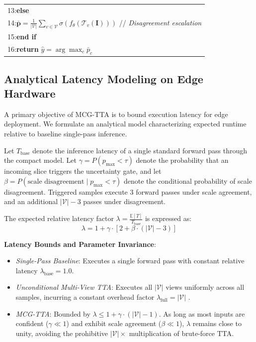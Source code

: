 \begin{table}[h]
\begin{tabular}{p{}}
13:\hspace{0.5em}\textbf{else} \\[0.2ex]
14:\hspace{1.5em}$\bar{\mathbf{p}} = \frac{1}{|\mathcal{V}|} \sum_{v \in \mathcal{V}} \sigma(f_\theta(\mathcal{T}_v(\mathbf{I})))$ \hfill // \emph{Disagreement escalation} \\[0.2ex]
15:\hspace{0.5em}\textbf{end if} \\[0.2ex]
16:\hspace{0.5em}\textbf{return} $\hat{y} = \arg\max_c \bar{p}_c$ \\
\bottomrule
\end{tabular}
\label{alg:mcg_tta}
\end{table}


\subsection{Analytical Latency Modeling on Edge Hardware}

A primary objective of MCG-TTA is to bound execution latency for edge deployment. We formulate an analytical model characterizing expected runtime relative to baseline single-pass inference.

Let $T_{\text{base}}$ denote the inference latency of a single standard forward pass through the compact model. Let $\gamma = P(p_{\max} < \tau)$ denote the probability that an incoming slice triggers the uncertainty gate, and let $\beta = P(\text{scale disagreement} \mid p_{\max} < \tau)$ denote the conditional probability of scale disagreement. Triggered samples execute 3 forward passes under scale agreement, and an additional $|\mathcal{V}| - 3$ passes under disagreement.

The expected relative latency factor $\lambda = \frac{\mathbb{E}[T]}{T_{\text{base}}}$ is expressed as:
\begin{equation}
\lambda = 1 + \gamma \cdot \left[ 2 + \beta \cdot (|\mathcal{V}| - 3) \right]
\label{eq:latency}
\end{equation}

\noindent\textbf{Latency Bounds and Parameter Invariance}:
\begin{itemize}
\item \emph{Single-Pass Baseline}: Executes a single forward pass with constant relative latency $\lambda_{\text{base}} = 1.0$.
\item \emph{Unconditional Multi-View TTA}: Executes all $|\mathcal{V}|$ views uniformly across all samples, incurring a constant overhead factor $\lambda_{\text{full}} = |\mathcal{V}|$ \cite{42}.
\item \emph{MCG-TTA}: Bounded by $\lambda \le 1 + \gamma \cdot (|\mathcal{V}| - 1)$. As long as most inputs are confident ($\gamma \ll 1$) and exhibit scale agreement ($\beta \ll 1$), $\lambda$ remains close to unity, avoiding the prohibitive $|\mathcal{V}|\times$ multiplication of brute-force TTA.
\end{itemize}

